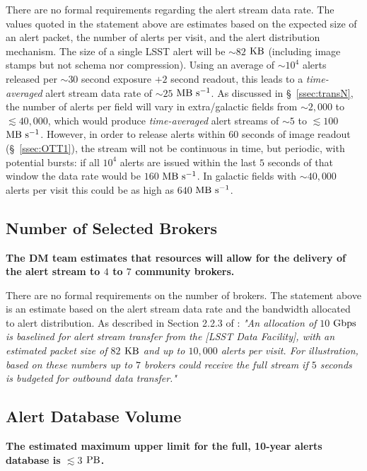 \documentclass[DM,authoryear,toc]{lsstdoc}
\begin{document}
There are no formal requirements regarding the alert stream data rate. The values quoted in the statement above are estimates based on the expected size of an alert packet, the number of alerts per visit, and the alert distribution mechanism. The size of a single LSST alert will be $\sim82$ $\rm KB$ (including image stamps but not schema nor compression). Using an average of $\sim10^4$ alerts released per $\sim30$ second exposure $+2$ second readout, this leads to a {\it time-averaged} alert stream data rate of  $\sim25$ $\rm MB\ s^{-1}$. As discussed in \S~\ref{ssec:transN}, the number of alerts per field will vary in extra/galactic fields from $\sim2,000$ to $\lesssim40,000$, which would produce {\it time-averaged} alert streams of $\sim5$ to $\lesssim100$ $\rm MB\ s^{-1}$. However, in order to release alerts within $60$ seconds of image readout (\S~\ref{ssec:OTT1}), the stream will not be continuous in time, but periodic, with potential bursts: if all $10^4$ alerts are issued within the last $5$ seconds of that window the data rate would be $160$ $\rm MB\ s^{-1}$. In galactic fields with $\sim40,000$ alerts per visit this could be as high as $640$ $\rm MB\ s^{-1}$.


\subsection{Number of Selected Brokers}\label{ssec:num_brokers}

{\bf The DM team estimates that resources will allow for the delivery of the alert stream to $4$ to $7$ community brokers.}

There are no formal requirements on the number of brokers. The statement above is an estimate based on the alert stream data rate and the bandwidth allocated to alert distribution. As described in Section 2.2.3 of : {\it "An allocation of $10$ $\rm Gbps$ is baselined for alert stream transfer from the [LSST Data Facility], with an estimated packet size of $82$ $\rm KB$ and up to $10,000$ alerts per visit. For illustration, based on these numbers up to $7$ brokers could receive the full stream if $5$ seconds is budgeted for outbound data transfer."} 


\subsection{Alert Database Volume}\label{ssec:adb_volume}

{\bf The estimated maximum upper limit for the full, 10-year alerts database is $\lesssim3$ $\rm PB$.}
\end{document}
